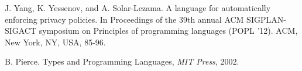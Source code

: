 \label{reference}

%
\begin{thebibliography}{00}

J. Yang, K. Yessenov, and A. Solar-Lezama. 
A language for automatically enforcing privacy policies. In Proceedings of the 39th annual ACM SIGPLAN-SIGACT symposium on Principles of programming languages (POPL '12). ACM, New York, NY, USA, 85-96.
    
B. Pierce. Types and Programming Languages, \emph{MIT Press}, 2002.
\end{thebibliography}